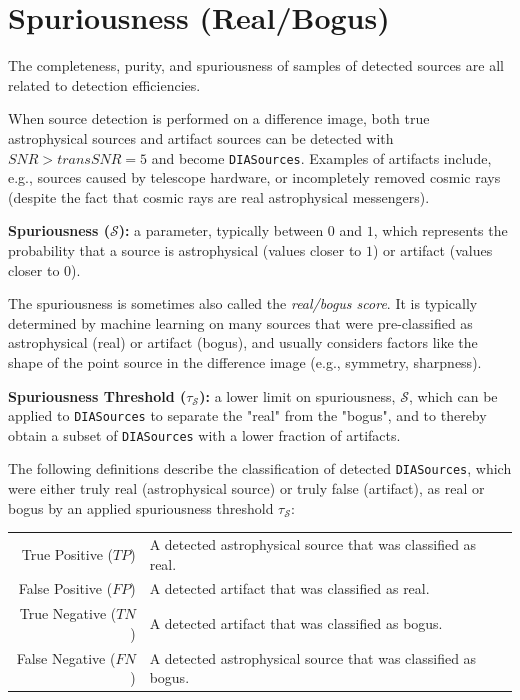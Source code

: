 \section{Spuriousness (Real/Bogus)}\label{sec:rb}

The completeness, purity, and spuriousness of samples of detected sources are all related to detection efficiencies. 

When source detection is performed on a difference image, both true astrophysical sources and artifact sources can be detected with $SNR > {transSNR} = 5$ and become {\tt DIASources}.
Examples of artifacts include, e.g., sources caused by telescope hardware, or incompletely removed cosmic rays (despite the fact that cosmic rays are real astrophysical messengers). 

{\bf Spuriousness ($\mathcal{S}$):} a parameter, typically between $0$ and $1$, which represents the probability that a source is astrophysical (values closer to $1$) or artifact (values closer to $0$).

The spuriousness is sometimes also called the {\it real/bogus score}.
It is typically determined by machine learning on many sources that were pre-classified as astrophysical (real) or artifact (bogus), and usually considers factors like the shape of the point source in the difference image (e.g., symmetry, sharpness). 

{\bf Spuriousness Threshold ($\tau_{\mathcal{S}}$):} a lower limit on spuriousness, $\mathcal{S}$, which can be applied to {\tt DIASources} to separate the "real" from the "bogus", and to thereby obtain a subset of {\tt DIASources} with a lower fraction of artifacts. 

The following definitions describe the classification of detected {\tt DIASources}, which were either truly real (astrophysical source) or truly false (artifact), as real or bogus by an applied spuriousness threshold $\tau_{\mathcal{S}}$:

\begin{tabular}{rl}
True Positive ($\mathit{TP}$) & A detected astrophysical source that was classified as real. \\
False Positive ($\mathit{FP}$) & A detected artifact that was classified as real. \\
True Negative ($\mathit{TN}$) & A detected artifact that was classified as bogus. \\
False Negative ($\mathit{FN}$) & A detected astrophysical source that was classified as bogus. \\
\end{tabular}

